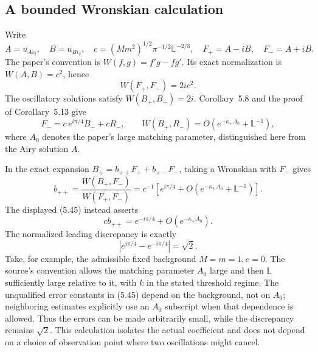 \documentclass[10pt]{article}
\begin{document}
\subsection*{A bounded Wronskian calculation}
Write \[A=u_{Ai_2},\quad B=u_{Bi_2},\quad
 c=(Mm^2)^{1/2}\pi^{-1/2}\mathbb L^{-2/3},
 \quad F_+=A-iB,\quad F_-=A+iB.\] The paper’s convention is \(W(f,g)=f'g-fg'\). Its exact normalization is \(W(A,B)=c^2\), hence \[W(F_+,F_-)=2ic^2.\] The oscillatory solutions satisfy \(W(B_+,B_-)=2i\). Corollary 5.8 and the proof of Corollary 5.13 give \[F_-=c\,e^{i\pi/4}B_-+cR_-,
 \qquad
 W(B_+,R_-)=O(e^{-\kappa_+A_0}+\mathbb L^{-1}),\] where \(A_0\) denotes the paper’s large matching parameter, distinguished here from the Airy solution \(A\).\par
In the exact expansion \(B_+=b_{++}F_++b_{+-}F_-\), taking a Wronskian with \(F_-\) gives \[b_{++}
  =\frac{W(B_+,F_-)}{W(F_+,F_-)}
  =c^{-1}\left[e^{i\pi/4}
                  +O(e^{-\kappa_+A_0}+\mathbb L^{-1})\right].\] The displayed (5.45) instead asserts \[cb_{++}=e^{-i\pi/4}+O(e^{-\kappa_+A_0}).\] The normalized leading discrepancy is exactly \[|e^{i\pi/4}-e^{-i\pi/4}|=\sqrt2.\] Take, for example, the admissible fixed background \(M=m=1,e=0\). The source’s convention allows the matching parameter \(A_0\) large and then \(\mathbb L\) sufficiently large relative to it, with \(k\) in the stated threshold regime. The unqualified error constants in (5.45) depend on the background, not on \(A_0\); neighboring estimates explicitly use an \(A_0\) subscript when that dependence is allowed. Thus the errors can be made arbitrarily small, while the discrepancy remains \(\sqrt2\). This calculation isolates the actual coefficient and does not depend on a choice of observation point where two oscillations might cancel.\par
\end{document}
